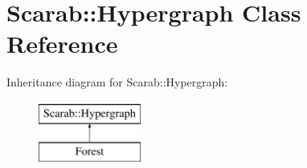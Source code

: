 \hypertarget{classScarab_1_1Hypergraph}{
\section{Scarab::Hypergraph Class Reference}
\label{classScarab_1_1Hypergraph}
}
Inheritance diagram for Scarab::Hypergraph:\begin{figure}[H]
\begin{center}
\leavevmode
\includegraphics[height=2cm]{classScarab_1_1Hypergraph}
\end{center}
\end{figure}
